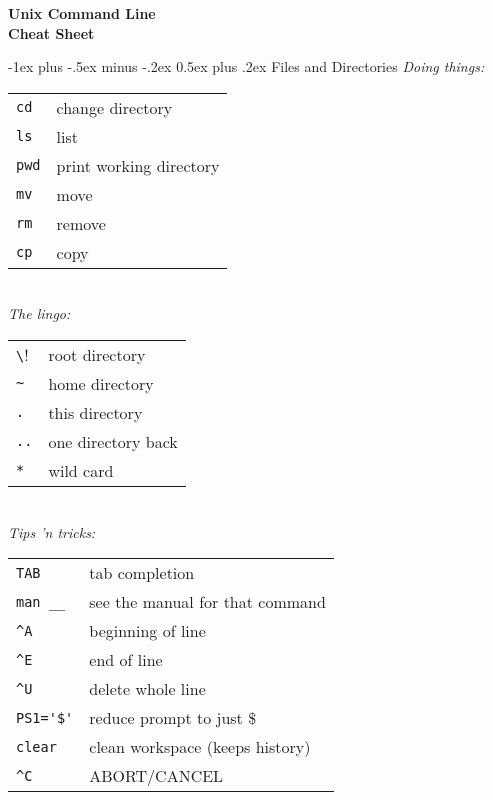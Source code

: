 \documentclass[10pt,landscape]{article}
\makeatletter
\renewcommand{\section}{\@startsection{section}{1}{0mm}%
                                {-1ex plus -.5ex minus -.2ex}%
                                {0.5ex plus .2ex}%
                                {\normalfont\large\bfseries}}
\makeatother
\begin{document}
\raggedright
\footnotesize
\begin{multicols}{3}


\setlength{\premulticols}{1pt}
\setlength{\postmulticols}{1pt}
\setlength{\multicolsep}{1pt}
\setlength{\columnsep}{2pt}

\begin{center}
     \Large{\textbf{Unix Command Line\\
      Cheat Sheet}} \\
\end{center}

\section{Files and Directories}
\emph{Doing things:} \\
\begin{tabular}{@{}ll@{}}
\verb!cd!  & change directory \\
\verb!ls!  & list \\
\verb!pwd! & print working directory \\
\verb!mv!  & move \\
\verb!rm!  & remove \\
\verb!cp!  & copy \\
\end{tabular}
\vspace{5mm}\\
\emph{The lingo:} \\
\begin{tabular}{@{}ll@{}}
\verb!\!  & root directory \\
\verb!~!  & home directory \\
\verb!.!  & this directory \\
\verb!..! & one directory back \\
\verb!*!  & wild card \\
\end{tabular}
\vspace{5mm}\\
\emph{Tips 'n tricks:} \\
\begin{tabular}{@{}ll@{}}
\verb!TAB!  & tab completion \\
\verb!man __!  & see the manual for that command \\
\verb!^A!  & beginning of line \\
\verb!^E!  & end of line \\
\verb!^U! & delete whole line \\
\verb!PS1='$'!  & reduce prompt to just \$ \\
\verb!clear!  & clean workspace (keeps history)\\
\verb!^C! & ABORT/CANCEL \\
\end{tabular}



\end{multicols}
\end{document}
